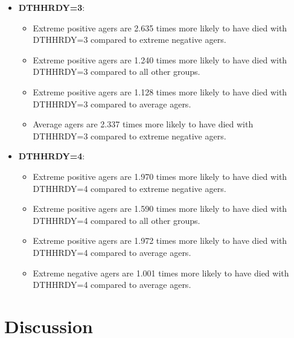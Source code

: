 \documentclass[twocolumn]{article}
\begin{document}
\begin{itemize}
    \item \textbf{DTHHRDY=3}:
    \begin{itemize}
        \item Extreme positive agers are 2.635 times more likely to have died with DTHHRDY=3 compared to extreme negative agers.
        \item Extreme positive agers are 1.240 times more likely to have died with DTHHRDY=3 compared to all other groups.
        \item Extreme positive agers are 1.128 times more likely to have died with DTHHRDY=3 compared to average agers.
        \item Average agers are 2.337 times more likely to have died with DTHHRDY=3 compared to extreme negative agers.
    \end{itemize}

    \item \textbf{DTHHRDY=4}:
    \begin{itemize}
        \item Extreme positive agers are 1.970 times more likely to have died with DTHHRDY=4 compared to extreme negative agers.
        \item Extreme positive agers are 1.590 times more likely to have died with DTHHRDY=4 compared to all other groups.
        \item Extreme positive agers are 1.972 times more likely to have died with DTHHRDY=4 compared to average agers.
        \item Extreme negative agers are 1.001 times more likely to have died with DTHHRDY=4 compared to average agers.
    \end{itemize}
\end{itemize}


\section{Discussion}
\end{document}

